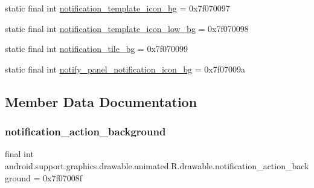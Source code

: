 \begin{DoxyCompactItemize}
\item 
static final int \mbox{\hyperlink{classandroid_1_1support_1_1graphics_1_1drawable_1_1animated_1_1R_1_1drawable_a47d89cad868f73d03a6a6f09466f7757}{notification\+\_\+template\+\_\+icon\+\_\+bg}} = 0x7f070097
\item 
static final int \mbox{\hyperlink{classandroid_1_1support_1_1graphics_1_1drawable_1_1animated_1_1R_1_1drawable_a7338e51e18b9d094b0084c7844db9876}{notification\+\_\+template\+\_\+icon\+\_\+low\+\_\+bg}} = 0x7f070098
\item 
static final int \mbox{\hyperlink{classandroid_1_1support_1_1graphics_1_1drawable_1_1animated_1_1R_1_1drawable_a4953f710df010071750b666cb85788fa}{notification\+\_\+tile\+\_\+bg}} = 0x7f070099
\item 
static final int \mbox{\hyperlink{classandroid_1_1support_1_1graphics_1_1drawable_1_1animated_1_1R_1_1drawable_afd5a7eb941d015ffa1256e11549c45e1}{notify\+\_\+panel\+\_\+notification\+\_\+icon\+\_\+bg}} = 0x7f07009a
\end{DoxyCompactItemize}


\subsection{Member Data Documentation}
\mbox{\label{classandroid_1_1support_1_1graphics_1_1drawable_1_1animated_1_1R_1_1drawable_a11bf3dd87b85eec07b682350dce74f85}} 
\subsubsection{\texorpdfstring{notification\+\_\+action\+\_\+background}{notification\_action\_background}}
{\footnotesize\ttfamily final int android.\+support.\+graphics.\+drawable.\+animated.\+R.\+drawable.\+notification\+\_\+action\+\_\+background = 0x7f07008f\hspace{0.3cm}{\ttfamily [static]}}

\mbox{\label{classandroid_1_1support_1_1graphics_1_1drawable_1_1animated_1_1R_1_1drawable_a867e41930939ea97edaed48e8c3f9677}} 
